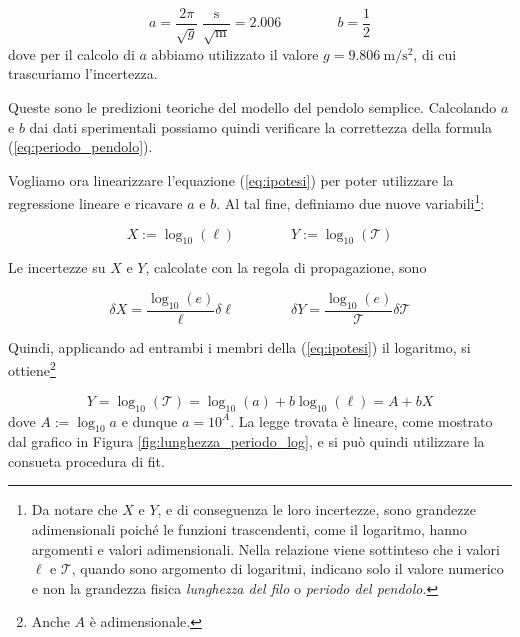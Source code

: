 \begin{equation}
    a = \frac{2\pi}{\sqrt{g}} \; \frac{\text{s}}{\sqrt{\text{m}}} = 2.006 \qquad \qquad b = \frac{1}{2}
\end{equation}
%
dove per il calcolo di $a$ abbiamo utilizzato il valore $g = \SI{9.806}{\meter\per\square\second}$, di cui trascuriamo l'incertezza.

Queste sono le predizioni teoriche del modello del pendolo semplice. Calcolando $a$ e $b$ dai dati sperimentali
possiamo quindi verificare la correttezza della formula (\ref{eq:periodo_pendolo}).

Vogliamo ora linearizzare l'equazione (\ref{eq:ipotesi}) per poter utilizzare la regressione lineare e ricavare $a$ e $b$.
Al tal fine, definiamo due nuove variabili\footnote{Da notare che $X$ e $Y$, e di conseguenza le loro incertezze,
sono grandezze adimensionali poiché
le funzioni trascendenti, come il logaritmo, hanno argomenti e valori adimensionali. Nella relazione viene sottinteso
che i valori $\ell$ e $\mathcal{T}$, quando sono argomento di logaritmi, indicano solo il valore numerico e non la grandezza fisica
\emph{lunghezza del filo} o \emph{periodo del pendolo}.}:

\begin{equation}
    X := \log_{10}{(\ell)} \qquad \qquad Y := \log_{10}{(\mathcal{T})}
    \label{eq:vars}
\end{equation}

Le incertezze su $X$ e $Y$, calcolate con la regola di propagazione, sono

\begin{equation}
    \delta X = \frac{\log_{10}(e)}{\ell}\delta \ell
    \qquad \qquad
    \delta Y = \frac{\log_{10}(e)}{\mathcal{T}}\delta\mathcal{T}
    \label{eq:delta_XY}
\end{equation}

Quindi, applicando ad entrambi i membri della (\ref{eq:ipotesi}) il logaritmo, si ottiene\footnote{
Anche $A$ è adimensionale.}

\begin{equation}
    Y = \log_{10} (\mathcal{T}) = \log_{10} (a) + b \log_{10} (\ell) = A + b X
\end{equation}
%
dove $A := \log_{10} a$ e dunque $a = 10^A$. La legge trovata è lineare, come mostrato dal grafico
in Figura \ref{fig:lunghezza_periodo_log}, e si può quindi utilizzare la consueta procedura di fit.


